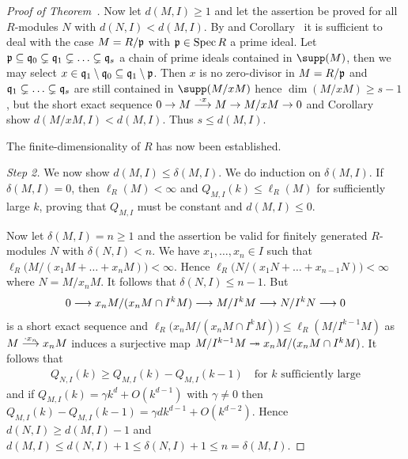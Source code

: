 \documentclass[a4paper,parskip=half,numbers=enddot, DIV=12]{scrreprt}
\begin{document}
\begin{proof}[Proof of Theorem~]
     Now let $d(M,I)\geq 1$ and let the assertion be proved for all $R$-modules $N$ with $d(N,I) < d(M,I)$. By  and Corollary~ it is sufficient to deal with the case $M=R/\mathfrak{p}$ with $\mathfrak{p}\in\operatorname{Spec} R$ a prime ideal. Let $\mathfrak{p} \subseteq \mathfrak{q}_0 \subsetneq \mathfrak{q}_1 \subsetneq \ldots \subsetneq \mathfrak{q}_s$ a chain of prime ideals contained in $\supp(M)$, then we may select $x\in \mathfrak{q}_1\setminus \mathfrak{q}_0 \subseteq \mathfrak{q}_1\setminus \mathfrak{p}$. Then $x$ is no zero-divisor in $M=R/\mathfrak{p}$ and $\mathfrak{q}_1\subsetneq \ldots \subsetneq \mathfrak{q}_s$ are still contained in $\supp(M/x M)$ hence $\dim(M/xM) \geq s -1$, but the short exact sequence $0\morphism M\morphism[\cdot x]M \morphism M/xM\morphism0$ and Corollary~ show $d(M/xM,I) <d(M,I)$. Thus $s \leq d(M,I)$.
    
    \begin{cor*}
        The finite-dimensionality of $R$ has now been established.
    \end{cor*}
    
    \emph{Step 2.} We now show $d(M,I)\leq \delta(M,I)$. We do induction on $\delta(M,I)$. If $\delta(M,I) = 0$, then $\ell_R(M) < \infty$ and $Q_{M,I}(k) \leq \ell_R(M)$ for sufficiently large $k$, proving that $Q_{M,I}$ must be constant and $d(M,I)\leq 0$. 
    
    Now let $\delta(M,I) =n\geq 1$ and the assertion be valid for finitely generated $R$-modules $N$ with $\delta(N,I) < n$. We have $x_1,\ldots,x_n\in I$ such that $\ell_R\big(M/(x_1M+\ldots+x_nM)\big)< \infty$. Hence $\ell_R\big(N/(x_1N+\ldots+x_{n-1}N)\big) < \infty$ where $N=M/x_n M$. It follows that $\delta(N,I) \leq n-1$. But
    \begin{align*}
        0 \morphism x_nM/(x_nM\cap I^k M) \morphism M/I^kM \morphism N/I^k N\morphism 0
    \end{align*}
    is a short exact sequence and $\ell_R\big(x_nM/(x_nM\cap I^k M)\big) \leq \ell_R(M/I^{k-1} M)$ as $M\morphism[\cdot x_n]x_nM$ induces a surjective map $M/I^{k-1} M \epimorphism x_nM / (x_nM \cap I^k M)$. It follows that 
    \begin{align*}
    	Q_{N,I}(k) \geq Q_{M,I}(k) - Q_{M,I}(k-1)\quad \text{for }k\text{ sufficiently large}
    \end{align*}
    and if $Q_{M,I} (k) = \gamma k^d + O(k^{d-1})$ with $\gamma\neq0$ then $Q_{M,I}(k) - Q_{M,I}(k-1) = \gamma dk^{d-1} + O(k^{d-2})$. Hence $d(N,I)\geq d(M,I) -1$ and $d(M,I) \leq d(N,I) +1 \leq \delta(N,I) +1 \leq n=\delta(M,I)$.
    

\end{proof}
\end{document}
